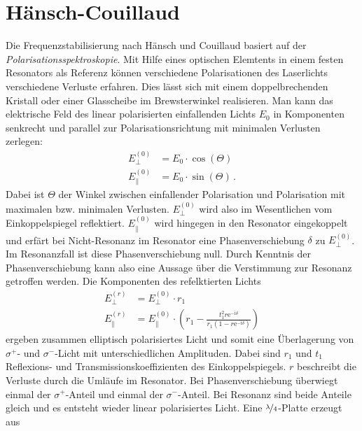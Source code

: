 \section{Hänsch-Couillaud}\label{sec:haensch-couillaud}
Die Frequenzstabilisierung nach Hänsch und Couillaud
basiert auf der \textit{Polarisationsspektroskopie}. Mit Hilfe eines
optischen Elemtents in einem festen Resonators als Referenz können verschiedene
Polarisationen des Laserlichts verschiedene Verluste erfahren. Dies lässt sich
mit einem doppelbrechenden Kristall oder einer Glasscheibe im Brewsterwinkel
realisieren. Man kann das elektrische Feld des linear polarisierten einfallenden
Lichts $E_0$ in Komponenten senkrecht und parallel zur Polarisationsrichtung mit
minimalen Verlusten zerlegen:
\begin{equation}\label{eq:haensch-couillaud_01}
	\begin{split}
		E_{\perp}^{(0)} & = E_0\cdot\cos{(\Theta)}\\
		E_{\parallel}^{(0)} & = E_0\cdot\sin{(\Theta)}\,.
	\end{split}
\end{equation}
Dabei ist $\Theta$ der Winkel zwischen einfallender Polarisation und
Polarisation mit maximalen bzw. minimalen Verlusten. $E_{\perp}^{(0)}$ wird also
im Wesentlichen vom Einkoppelspiegel reflektiert. $E_{\parallel}^{(0)}$
wird hingegen in den Resonator eingekoppelt und erfärt bei Nicht-Resonanz im
Resonator eine Phasenverschiebung $\delta$ zu $E_{\perp}^{(0)}$. Im Resonanzfall
ist diese Phasenverschiebung null. Durch Kenntnis der Phasenverschiebung kann
also eine Aussage über die Verstimmung zur Resonanz getroffen werden. Die
Komponenten des refelktierten Lichts
\begin{equation}\label{eq:haensch-couillaud_02}
	\begin{split}
		E_{\perp}^{(r)} & = E_{\perp}^{(0)}\cdot r_1\\
		E_{\parallel}^{(r)} & = E_{\parallel}^{(0)}\cdot\left(r_1-\frac{t_1^2r\mathrm{e}^{-\mathrm{i}\delta}}{r_1\left(1-r\mathrm{e}^{-\mathrm{i}\delta}\right)}\right)
	\end{split}
\end{equation}
ergeben zusammen elliptisch polarisiertes Licht und somit eine Überlagerung von
$\sigma^+$- und $\sigma^-$-Licht mit unterschiedlichen Amplituden. Dabei sind
$r_1$ und $t_1$ Reflexions- und Transmissionskoeffizienten des
Einkoppelspiegels. $r$ beschreibt die Verluste durch die Umläufe im Resonator.
Bei Phasenverschiebung überwiegt einmal der $\sigma^+$-Anteil und einmal der $\sigma^-$-Anteil. Bei Resonanz sind beide Anteile gleich und es entsteht wieder linear polarisiertes Licht. Eine $\nicefrac{\lambda}{4}$-Platte erzeugt aus
